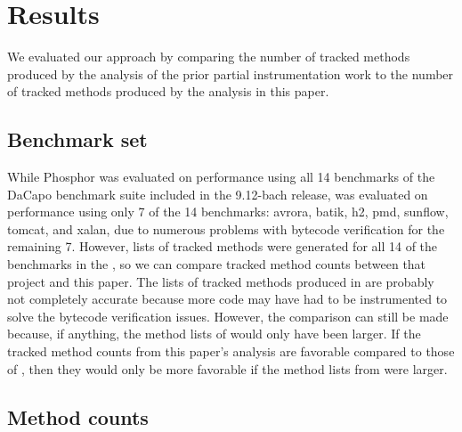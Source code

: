 \chapter{Results}
We evaluated our approach by comparing the number of tracked methods produced by the analysis of the prior partial instrumentation work to the number of tracked methods produced by the analysis in this paper.

\section{Benchmark set}
While Phosphor \cite{phosphor_oopsla} was evaluated on performance using all 14 benchmarks of the  DaCapo benchmark suite \cite{dacapobach} included in the 9.12-bach release, \cite{manoj_project} was evaluated on performance using only 7 of the 14 benchmarks: avrora, batik, h2, pmd, sunflow, tomcat, and xalan, due to numerous problems with bytecode verification for the remaining 7. However, lists of tracked methods were generated for all 14 of the benchmarks in the \cite{manoj_project}, so we can compare tracked method counts between that project and this paper. The lists of tracked methods produced in \cite{manoj_project} are probably not completely accurate because more code may have had to be instrumented to solve the bytecode verification issues. However, the comparison can still be made because, if anything, the method lists of \cite{manoj_project} would only have been larger. If the tracked method counts from this paper's analysis are favorable compared to those of \cite{manoj_project}, then they would only be more favorable if the method lists from \cite{manoj_project} were larger.

\section{Method counts}


